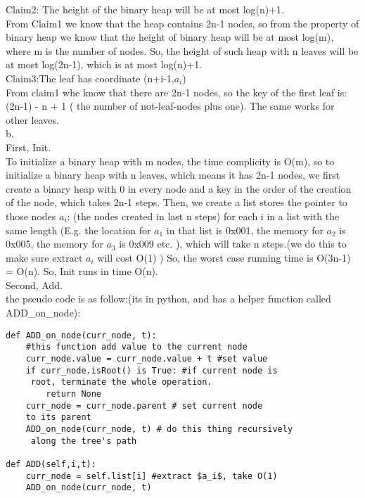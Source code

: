 \documentclass{article}
\begin{document}
Claim2: The height of the binary heap will be at most log(n)+1.\\ From Claim1 we know that the heap contains 2n-1 nodes, so from the property of binary heap we know that the height of binary heap will be at most log(m), where m is the number of nodes. So, the height of such heap with n leaves will be at most log(2n-1), which is at most log(n)+1.\\
Claim3:The leaf has coordinate (n+i-1,$a_i$)\\
From claim1 whe know that there are 2n-1 nodes, so the key of the first leaf is: (2n-1) - n + 1 ( the number of not-leaf-nodes plus one). The same works for other leaves.\\
b.\\
First, Init. \\
To initialize a binary heap with m nodes, the time complicity is O(m), so to initialize a binary heap with n leaves, which means it has 2n-1 nodes, we first create a binary heap with 0 in every node and a key in the order of the creation of the node, which takes 2n-1 steps. Then, we create a list stores the pointer to those nodes $a_i$: (the nodes created in last n steps) for each i in a list with the same length (E.g. the location for $a_1$ in that list is 0x001, the memory for $a_2$ is 0x005, the memory for $a_3$ is 0x009 etc. ), which will take n steps.(we do this to make sure extract $a_i$ will cost  O(1) ) So, the worst case running time is O(3n-1) = O(n). So, Init runs in time O(n).\\
Second, Add.\\
the pseudo code is as follow:(its in python, and has a helper
function called ADD\_on\_node):
\begin{lstlisting}
def ADD_on_node(curr_node, t):
	#this function add value to the current node
	curr_node.value = curr_node.value + t #set value
	if curr_node.isRoot() is True: #if current node is
	 root, terminate the whole operation.
		return None
	curr_node = curr_node.parent # set current node 
	to its parent
	ADD_on_node(curr_node, t) # do this thing recursively
	 along the tree's path

def ADD(self,i,t):
	curr_node = self.list[i] #extract $a_i$, take O(1)
	ADD_on_node(curr_node, t)
\end{lstlisting}
\end{document}
